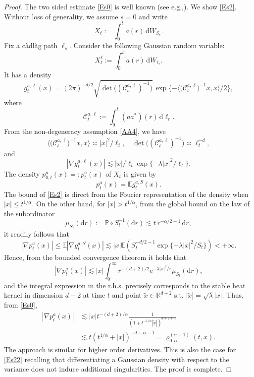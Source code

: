 \documentclass[11pt]{article}
\newcommand{\eg}{e.g.,\xspace}
\numberwithin{equation}{section}\providecommand{\asymp}{\mathrel{\sim}}
\newcommand{\rd}{\mathrm{d}}
\theoremstyle{plain}
\theoremstyle{definition}
\newcommand\e{\mathrm{e}}
\let\<\langle
\let\>\rangle
\newcommand\cC{{\mathcal C}}
\newcommand\mE{\mathbb{E}}
\newcommand\mP{\mathbb{P}}
\newcommand\mR{\mathbb{R}}
\newcommand\1{{\mathbf{1}}}
\newcommand{\dif}{\,\mathrm{d}}
\begin{document}
\begin{proof}
The two sided estimate \eqref{Es0} is well known (see \eg \cite{Ch-Zh1}).
We show \eqref{Es2}.
Without loss of generality, we assume $s=0$ and write
\[
X_{t}:=\int^t_0a(r)\dif W_{S_r}.
\]
Fix a càdlàg path $\ell_s$. Consider the following Gaussian random variable:
\[
X^\ell_{t}:=\int^t_0a(r)\dif W_{\ell_r}.
\]
It has a density
\begin{equation*}%
g^{a,\ell}_{t}(x)=(2\pi)^{-d/2}\sqrt{\det\bigl( (\cC_{t}^{a,\ell})^{-1}\bigr)}\,\exp\{-\<\bigl(\cC_t^{a,\ell}\bigr)^{-1}x,x\>/2\},
\end{equation*}
where
\[
\cC_t^{a,\ell}:=\int^t_0(aa^*)(r)\dif \ell_r.
\]
From the non-degeneracy assumption \eqref{AA4}, we have
\[
\<\bigl(\cC_t^{a,\ell}\bigr)^{-1}x,x\>\asymp|x|^2/\ell_t,\quad \det\bigl( (\cC_t^{a,\ell})^{-1}\bigr)\asymp \ell_t^{-d},
\]
and
\[
|\nabla g^{a,\ell}_{t}(x)|\lesssim |x|/\ell_t\exp\{-\lambda|x|^2/\ell_t\}.
\]
The density $p_{0,t}^{a}(x)=:p_{t}^{a}(x)$ of $X_{t}$ is given by
\begin{equation}\label{SUB_STABLE_DENS}
p_{t}^{a}(x)=\mE g^{a,S}_{t}(x).
\end{equation}
The bound of \eqref{Es2} is direct from the Fourier representation of the density when $|x|\le t^{1/\alpha}$.
On the other hand, for $|x|>t^{1/\alpha} $, from the global bound on the law of the subordinator
\[
\mu_{S_t}(\rd r):=\mP\circ S_t^{-1}(\rd r)\lesssim t\, r^{-\alpha/2-1}\dif r,
\]
it readily follows that
\begin{equation*}
|\nabla p_{t}^a(x)|\leq\mE |\nabla g^{a,S}_{t}(x)|
\lesssim|x|\mE(S_t^{-d/2-1}\exp\{-\lambda|x|^2/S_t\})<+\infty.
\end{equation*}
Hence, from the bounded convergence theorem it holds that
\begin{equation*}
|\nabla p_{t}^a(x)|\lesssim|x|\int^\infty_0 r^{-(d+2)/2}\e^{-\lambda |x|^2/r}\mu_{S_t}(\rd r),
\end{equation*}
and the integral expression in the r.h.s. precisely corresponds to the stable heat kernel in dimension $d+2$ at time $t$ and point $\tilde x\in \mR^{d+2} $ s.t. $|\tilde x|=\sqrt{\lambda}|x| $. Thus, from \eqref{Es0},
\begin{align*}
|\nabla p_{t}^a(x)|&\lesssim |x| t^{-(d+2)/\alpha}\frac{1}{(1+t^{-1/\alpha} |\tilde x|)^{d+2+\alpha}}\\
&\lesssim t(t^{1/\alpha}+|x|)^{-d-\alpha-1}=\varrho^{(\alpha+1)}_{0,\alpha}(t,x).
\end{align*}
The approach is similar for higher order derivatives. This is also the case for \eqref{Es22} recalling that differentiating a Gaussian density with respect to the variance does not induce additional singularities.
The proof is complete.
\end{proof}
\end{document}
